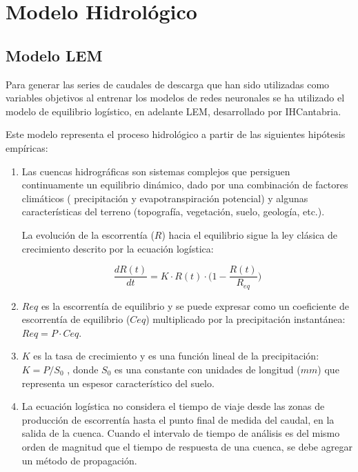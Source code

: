 \chapter{Modelo Hidrológico}
\label{capitulo 2}
\section{Modelo LEM}
Para generar las series de caudales de descarga que han sido utilizadas como variables objetivos
al entrenar los modelos de redes neuronales se ha utilizado el modelo 
de equilibrio logístico, en adelante LEM, desarrollado por IHCantabria. 

Este modelo representa el proceso hidrológico a partir de las siguientes hipótesis empíricas:
\begin{enumerate}
    \item Las cuencas hidrográficas son sistemas complejos que persiguen continuamente un equilibrio dinámico, 
    dado por una combinación de factores climáticos ( precipitación y evapotranspiración potencial) 
    y algunas características del terreno (topografía, vegetación, suelo, geología, etc.). 

    La evolución de la escorrentía ($R$) hacia el equilibrio sigue la ley clásica de crecimiento descrito por la 
    ecuación logística:

    \begin{equation}
        \frac{d R(t)}{dt}=K\cdot R(t)\cdot\big(1-\frac{R(t)}{R_{eq}}\big)
    \label{eq.log}
    \end{equation}

    \item  $Req$ es la escorrentía de equilibrio  y se puede expresar como un coeficiente de escorrentía de 
    equilibrio ($Ceq$) multiplicado por la precipitación instantánea: $Req = P \cdot Ceq$. 
    
    \item $K$ es la tasa de crecimiento y es una función lineal de la precipitación: $K=P/S_0$ , donde $S_0$ 
    es una constante con unidades de longitud ($mm$) que representa un espesor característico del suelo.
    \item La ecuación logística no considera el  tiempo de viaje desde las 
    zonas de producción de escorrentía hasta el punto final de medida del caudal, en la salida de la cuenca. 
    Cuando el intervalo de tiempo de análisis es del mismo orden de magnitud que el tiempo 
    de respuesta de una cuenca, se debe agregar un método de propagación.


\end{enumerate}

